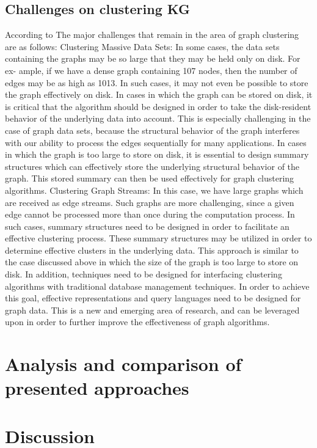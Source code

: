 \documentclass[runningheads]{llncs}
\begin{document}
\subsection{Challenges on clustering KG}
According to \cite{Aggarwal} The major challenges that remain in the area of graph clustering are as follows:
Clustering Massive Data Sets: In some cases, the data sets containing the graphs may be so large that they may be held only on disk. For ex- ample, if we have a dense graph containing 107 nodes, then the number of edges may be as high as 1013. In such cases, it may not even be possible to store the graph effectively on disk. In cases in which the graph can be stored on disk, it is critical that the algorithm should be designed in order to take the disk-resident behavior of the underlying data into account. This is especially challenging in the case of graph data sets, because the structural behavior of the graph interferes with our ability to process the edges sequentially for many applications. In cases in which the graph is too large to store on disk, it is essential to design summary structures which can effectively store the underlying structural behavior of the graph. This stored summary can then be used effectively for graph clustering algorithms.
Clustering Graph Streams: In this case, we have large graphs which are received as edge streams. Such graphs are more challenging, since a given edge cannot be processed more than once during the computation process. In such cases, summary structures need to be designed in order to facilitate an effective clustering process. These summary structures may be utilized in order to determine effective clusters in the underlying data. This approach is similar to the case discussed above in which the size of the graph is too large to store on disk.
In addition, techniques need to be designed for interfacing clustering algorithms with traditional database management techniques. In order to achieve this goal, effective representations and query languages need to be designed for graph data. This is a new and emerging area of research, and can be leveraged upon in order to further improve the effectiveness of graph algorithms.




\section{Analysis and comparison of presented approaches} \label{analysis}
\section{Discussion} \label{discussion}
\end{document}
